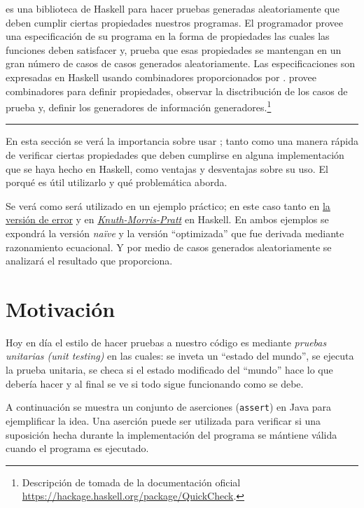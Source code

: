 \QuickCheck es una biblioteca de Haskell para hacer pruebas generadas aleatoriamente que deben
cumplir ciertas propiedades nuestros programas. El programador provee una especificación de su
programa en la forma de propiedades las cuales las funciones deben satisfacer y, \QuickCheck prueba
que esas propiedades se mantengan en un gran número de casos de casos generados aleatoriamente. Las
especificaciones son expresadas en Haskell usando combinadores proporcionados por \QuickCheck.
\QuickCheck provee combinadores para definir propiedades, observar la disctribución de los casos
de prueba y, definir los generadores de información generadores.\footnote{
    Descripción de \QuickCheck tomada de la documentación oficial\\
    \url{https://hackage.haskell.org/package/QuickCheck}.
}

\noindent\rule{\textwidth}{1pt}

En esta sección se verá la importancia sobre usar \QuickCheck; tanto como una manera rápida de
verificar ciertas propiedades que deben cumplirse en alguna implementación que se haya hecho en
Haskell, como ventajas y desventajas sobre su uso. El porqué es útil utilizarlo y qué problemática
aborda.

Se verá como será utilizado en un ejemplo práctico; en este caso tanto en
\hyperlink{funcional:funcion_error}{la versión de error} y en
\hyperlink{funcional:kmp}{\textit{Knuth-Morris-Pratt}} en Haskell. En ambos ejemplos se expondrá la
versión \textit{naïve} y la versión ``optimizada'' que fue derivada mediante razonamiento
ecuacional. Y por medio de casos generados aleatoriamente se analizará el resultado que
\QuickCheck proporciona.

\section{Motivación}
Hoy en día el estilo de hacer pruebas a nuestro código es mediante \textit{pruebas unitarias (unit
testing)} en las cuales: se inveta un ``estado del mundo'', se ejecuta la prueba unitaria, se
checa si el estado modificado del ``mundo'' hace lo que debería hacer y al final se ve si todo
sigue funcionando como se debe.

A continuación se muestra un conjunto de aserciones (\texttt{assert}) en Java para ejemplificar
la idea. Una aserción puede ser utilizada para verificar si una suposición hecha durante la
implementación del programa se mántiene válida cuando el programa es ejecutado.

